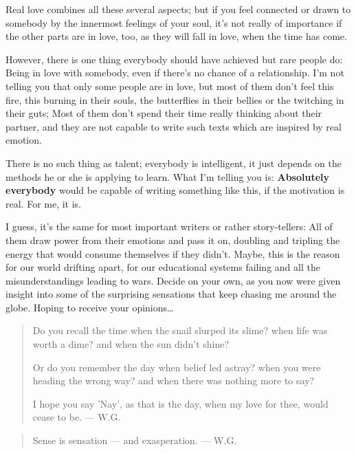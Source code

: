 Real love combines all these several aspects; but if you feel connected or drawn to somebody by the innermost feelings of your soul, it's not really of importance if the other parts are in love, too, as they will fall in love, when the time has come.

However, there is one thing everybody should have achieved but rare people do: Being in love with somebody, even if there's no chance of a relationship. 
I'm not telling you that only some people are in love, but most of them don't feel this fire, this burning in their souls, the butterflies in their bellies or the twitching in their guts; Most of them don't spend their time really thinking about their partner, and they are not capable to write such texts which are inspired by real emotion.

There is no such thing as talent; everybody is intelligent, it just depends on the methods he or she is applying to learn. 
What I'm telling you is: \textbf{Absolutely everybody} would be capable of writing something like this, if the motivation is real. 
For me, it is.

I guess, it's the same for most important writers or rather story-tellers: All of them draw power from their emotions and pass it on, doubling and tripling the energy that would consume themselves if they didn't. 
Maybe, this is the reason for our world drifting apart, for our educational systems failing and all the misunderstandings leading to wars. 
Decide on your own, as you now were given insight into some of the surprising sensations that keep chasing me around the globe. 
Hoping to receive your opinions\ldots

\begin{verse}
Do you recall the time
when the snail slurped its slime?
when life was worth a dime?
and when the sun didn't shine?

Or do you remember the day
when belief led astray?
when you were heading the wrong way?
and when there was nothing more to say?

I hope you say 'Nay',
as that is the day,
when my love for thee,
would cease to be. 
--- W.G.
\end{verse}

\begin{verse}
Sense is sensation --- and exasperation. 
--- W.G.
\end{verse}

